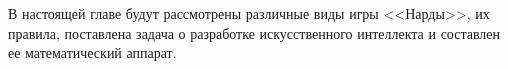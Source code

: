 В настоящей главе будут рассмотрены различные виды игры <<Нарды>>, их правила, поставлена задача о разработке искусственного интеллекта и составлен ее математический аппарат.
